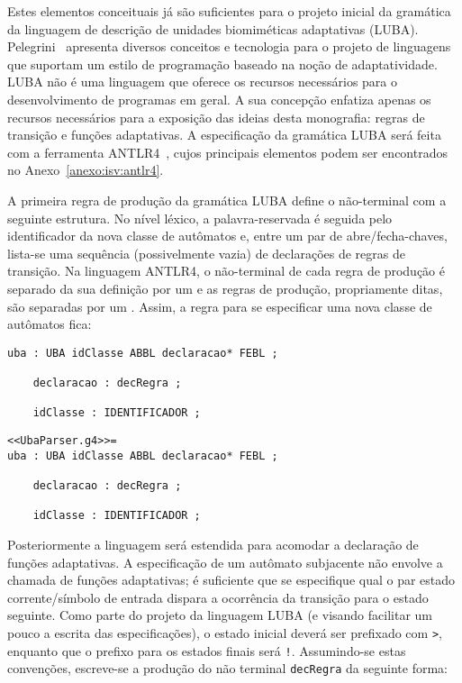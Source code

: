 
Estes elementos conceituais já são suficientes para o projeto inicial da gramática da linguagem de descrição de unidades biomiméticas adaptativas (LUBA). Pelegrini~\cite{pelegrini:2009} apresenta diversos conceitos e tecnologia para o projeto de linguagens que suportam um estilo de programação baseado na noção de adaptatividade. LUBA não é uma linguagem que oferece os recursos necessários para o desenvolvimento de programas em geral. A sua concepção enfatiza apenas os recursos necessários para a exposição das ideias desta monografia: regras de transição e funções adaptativas. A especificação da gramática LUBA será feita com a ferramenta ANTLR4~\cite{parr:2013}, cujos principais elementos podem ser encontrados no Anexo~\ref{anexo:isv:antlr4}.

A primeira regra de produção da gramática LUBA define o não-terminal  com a seguinte estrutura. No nível léxico, a palavra-reservada  é seguida pelo identificador da nova classe de autômatos e, entre um par de abre/fecha-chaves, lista-se uma sequência (possivelmente vazia) de declarações de regras de transição. Na linguagem ANTLR4, o não-terminal de cada regra de produção é separado da sua definição por um \terminal{:} e as regras de produção, propriamente ditas, são separadas por um \terminal{;}. Assim, a regra para se especificar uma nova classe de autômatos  fica:

\begin{lstlisting}[style=antlr]
uba : UBA idClasse ABBL declaracao* FEBL ;

	declaracao : decRegra ;

	idClasse : IDENTIFICADOR ;
\end{lstlisting}

\begin{lstlisting}[style=antlr]
<<UbaParser.g4>>=
uba : UBA idClasse ABBL declaracao* FEBL ;

	declaracao : decRegra ;

	idClasse : IDENTIFICADOR ;
\end{lstlisting}

Posteriormente a linguagem será estendida para acomodar a declaração de funções adaptativas. A especificação de um autômato subjacente não envolve a chamada de funções adaptativas; é suficiente que se especifique qual o par estado corrente/símbolo de entrada dispara a ocorrência da transição para o estado seguinte. Como parte do projeto da linguagem LUBA (e visando facilitar um pouco a escrita das especificações), o estado inicial deverá ser prefixado com \lstinline[style=antlr]'>', enquanto que o prefixo para os estados finais será \lstinline[style=antlr]'!'. Assumindo-se estas convenções, escreve-se a produção do não terminal \lstinline[style=antlr]!decRegra! da seguinte forma:

